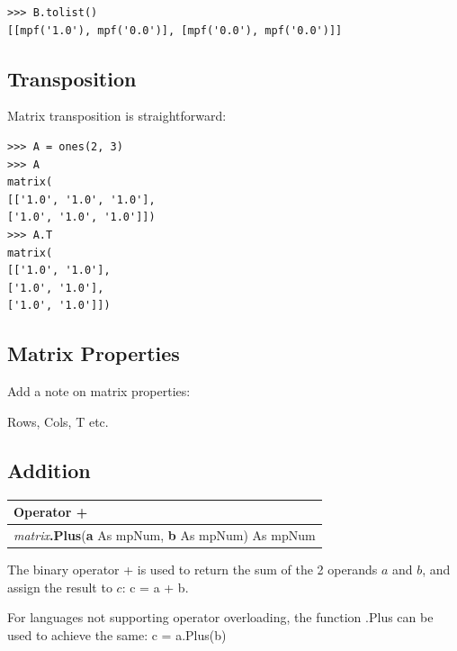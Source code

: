 \begin{lstlisting}
>>> B.tolist()
[[mpf('1.0'), mpf('0.0')], [mpf('0.0'), mpf('0.0')]]
\end{lstlisting}




\subsection{Transposition}

Matrix transposition is straightforward:

\begin{lstlisting}
>>> A = ones(2, 3)
>>> A
matrix(
[['1.0', '1.0', '1.0'],
['1.0', '1.0', '1.0']])
>>> A.T
matrix(
[['1.0', '1.0'],
['1.0', '1.0'],
['1.0', '1.0']])
\end{lstlisting}


\subsection{Matrix Properties}

Add a note on matrix properties:

Rows, Cols, T etc.






\subsection{Addition}
\begin{tabular}{p{481pt}}
	\toprule
	\textsf{Operator \textbf{+}}\index{Multiprecision Functions!+} \\
	\midrule
	\textsf{\textit{matrix}\textbf{.Plus}(\textbf{a} As mpNum, \textbf{b} As mpNum) As mpNum}\index{Multiprecision Functions!.Plus} \\
	\bottomrule
\end{tabular}

\vspace{0.3cm}
The binary operator + is used to return the sum of the 2 operands $a$ and $b$, and assign the result to $c$: \textsf{c = a + b}.

For languages not supporting operator overloading, the function \textsf{.Plus} can be used to achieve the same: \textsf{c = a.Plus(b)}


